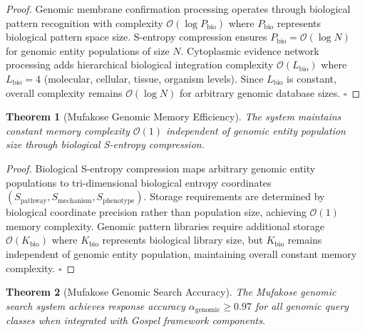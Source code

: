 \documentclass[12pt,a4paper]{article}
\newtheorem{theorem}{Theorem}[section]
\begin{document}
\begin{proof}
Genomic membrane confirmation processing operates through biological pattern recognition with complexity $\mathcal{O}(\log P_{\text{bio}})$ where $P_{\text{bio}}$ represents biological pattern space size. S-entropy compression ensures $P_{\text{bio}} = \mathcal{O}(\log N)$ for genomic entity populations of size $N$. Cytoplasmic evidence network processing adds hierarchical biological integration complexity $\mathcal{O}(L_{\text{bio}})$ where $L_{\text{bio}} = 4$ (molecular, cellular, tissue, organism levels). Since $L_{\text{bio}}$ is constant, overall complexity remains $\mathcal{O}(\log N)$ for arbitrary genomic database sizes. $\square$
\end{proof}

\begin{theorem}[Mufakose Genomic Memory Efficiency]
The system maintains constant memory complexity $\mathcal{O}(1)$ independent of genomic entity population size through biological S-entropy compression.
\end{theorem}

\begin{proof}
Biological S-entropy compression maps arbitrary genomic entity populations to tri-dimensional biological entropy coordinates $(S_{\text{pathway}}, S_{\text{mechanism}}, S_{\text{phenotype}})$. Storage requirements are determined by biological coordinate precision rather than population size, achieving $\mathcal{O}(1)$ memory complexity. Genomic pattern libraries require additional storage $\mathcal{O}(K_{\text{bio}})$ where $K_{\text{bio}}$ represents biological library size, but $K_{\text{bio}}$ remains independent of genomic entity population, maintaining overall constant memory complexity. $\square$
\end{proof}

\begin{theorem}[Mufakose Genomic Search Accuracy]
The Mufakose genomic search system achieves response accuracy $\alpha_{\text{genomic}} \geq 0.97$ for all genomic query classes when integrated with Gospel framework components.
\end{theorem}
\end{document}
